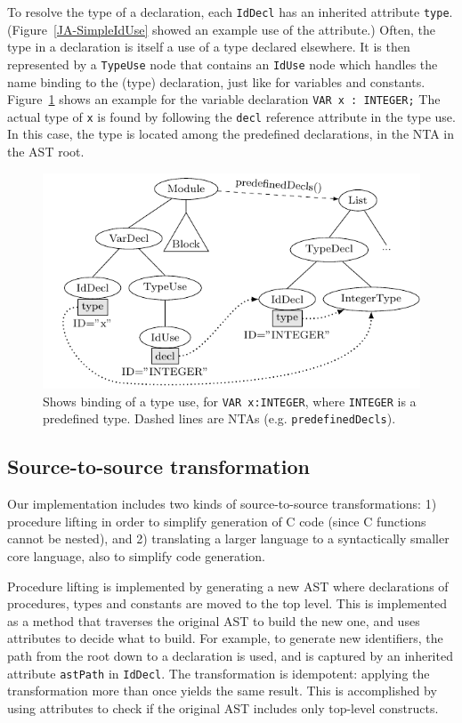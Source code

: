 To resolve the type of a declaration, each \texttt{IdDecl} has an inherited attribute \texttt{type}. (Figure~\ref{JA-SimpleIdUse} showed an example use of the attribute.) Often, the type in a declaration is itself a use of a type declared elsewhere. It is then represented by a \texttt{TypeUse} node that contains an \texttt{IdUse} node which handles the name binding to the (type) declaration, just like for variables and constants. Figure~\ref{JA-PredefinedDecls} shows an example for the variable declaration \texttt{VAR~x~:~INTEGER;} The actual type of \texttt{x} is found by following the \texttt{decl} reference attribute in the type use. In this case, the type is located among the predefined declarations, in the NTA in the AST root.

\begin{figure}
\begin{center}
\includegraphics{jastadd/predefined-decls.pdf}
\caption{Shows binding of a type use, for \texttt{VAR x:INTEGER}, where \texttt{INTEGER} is a predefined type. Dashed lines are NTAs (e.g. \texttt{predefinedDecls}).}
\label{JA-PredefinedDecls}
\end{center}
\end{figure}


%
%
\subsection{Source-to-source transformation}
Our implementation includes two kinds of source-to-source transformations: 1) procedure lifting in order to simplify generation of C code (since C functions cannot be nested), and 2) translating a larger language to a syntactically smaller core language, also to simplify code generation. 

Procedure lifting is implemented by generating a new AST where declarations of procedures, types and constants are moved to the top level. This is implemented as a method that traverses the original AST to build the new one, and uses attributes to decide what to build. For example, to generate new identifiers, the path from the root down to a declaration is used, and is captured by an inherited attribute \texttt{astPath} in \texttt{IdDecl}. The transformation is idempotent: applying the transformation more than once yields the same result. This is accomplished by using attributes to check if the original AST includes only top-level constructs.

